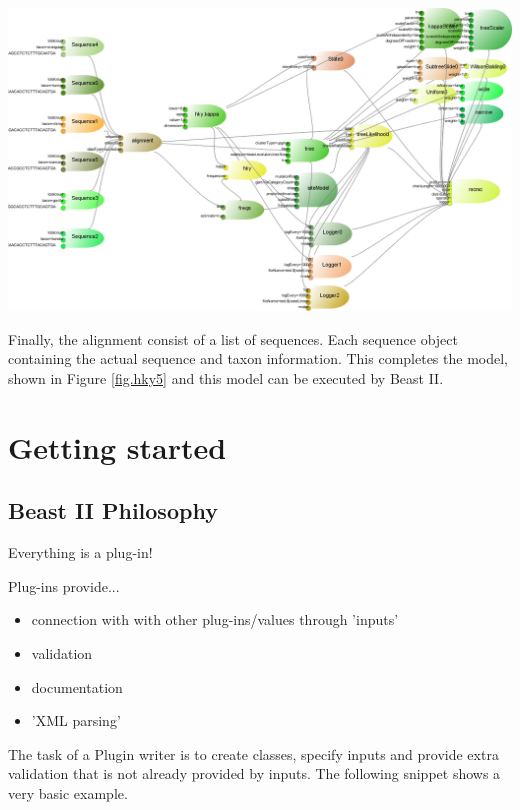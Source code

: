 \documentclass{article}
\begin{document}
\includegraphics[width=\textwidth]{example6.png}
\rm\\\hskip10pt



Finally, the alignment consist of a list of sequences. Each sequence object containing
the actual sequence and taxon information. This completes the model, shown in Figure 
\ref{fig.hky5} and this model can be executed by Beast II.





\section{Getting started\label{sec.start}}


\subsection{Beast II Philosophy}

Everything is a plug-in!

Plug-ins provide...
\begin{itemize}
\item connection with with other plug-ins/values through 'inputs'
\item validation
\item documentation
\item 'XML parsing'
\end{itemize}

The task of a Plugin writer is to create classes, specify inputs and provide 
extra validation that is not already provided by inputs. The following snippet
shows a very basic example.
\end{document}
